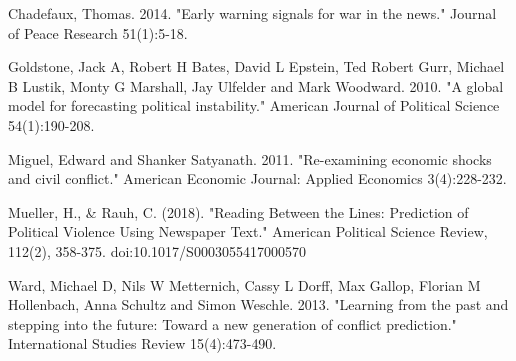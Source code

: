 \noindent Chadefaux, Thomas. 2014. "Early warning signals for war in the news." Journal of Peace \newline \indent Research 51(1):5-18.\vspace{0.25cm}

\noindent Goldstone, Jack A, Robert H Bates, David L Epstein, Ted Robert Gurr, Michael B Lustik, \newline \indent Monty G Marshall, Jay Ulfelder and Mark Woodward. 2010. "A global model for \newline \indent forecasting political instability." American Journal of Political Science 54(1):190-208.\vspace{0.25cm}

\noindent Miguel, Edward and Shanker Satyanath. 2011. "Re-examining economic shocks and civil \newline \indent conflict." American Economic Journal: Applied Economics 3(4):228-232.\vspace{0.25cm}

\noindent Mueller, H., \& Rauh, C. (2018). "Reading Between the Lines: Prediction of Political \newline \indent Violence Using Newspaper Text." American Political Science Review, 112(2), 358-375. \newline \indent doi:10.1017/S0003055417000570\vspace{0.25cm}

\noindent Ward, Michael D, Nils W Metternich, Cassy L Dorff, Max Gallop, Florian M Hollenbach, \newline \indent Anna Schultz and Simon Weschle. 2013. "Learning from the past and stepping into \newline \indent the future: Toward a new generation of conflict prediction." International Studies \newline \indent Review 15(4):473-490.

\clearpage

